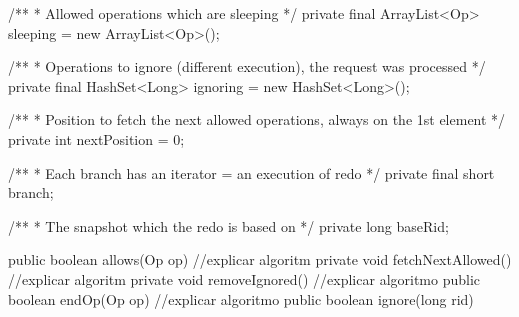    /**
    * Allowed operations which are sleeping
    */
   private final ArrayList<Op> sleeping = new ArrayList<Op>();

   /**
    * Operations to ignore (different execution), the request was processed
    */
   private final HashSet<Long> ignoring = new HashSet<Long>();

   /**
    * Position to fetch the next allowed operations, always on the 1st element
    */
   private int nextPosition = 0;

   /**
    * Each branch has an iterator = an execution of redo
    */
   private final short branch;

   /**
    * The snapshot which the redo is based on
    */
   private long baseRid;

   public boolean allows(Op op) //explicar algoritm
   private void fetchNextAllowed() //explicar algoritm
   private void removeIgnored() //explicar algoritmo
   public boolean endOp(Op op) //explicar algoritmo
   public boolean ignore(long rid) 







